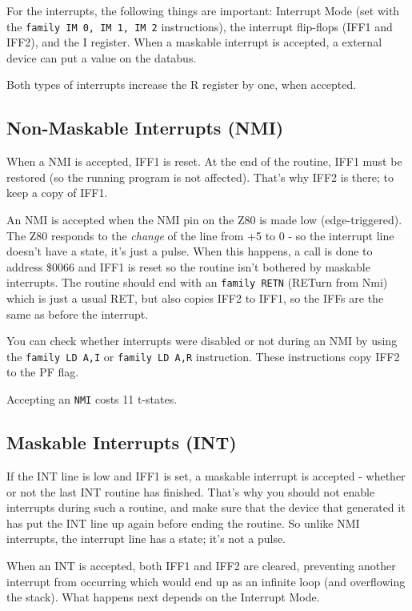 \documentclass[twoside,openright,a4paper]{book}
\begin{document}
For the interrupts, the following things are important: Interrupt Mode (set with the {\tt family IM 0, IM 1, IM 2} instructions), the interrupt flip-flops (IFF1 and IFF2), and the I register. When a maskable interrupt is accepted, a external device can put a value on the databus.

Both types of interrupts increase the R register by one, when accepted.


\subsection{Non-Maskable Interrupts (NMI)}

When a NMI is accepted, IFF1 is reset. At the end of the routine, IFF1 must be restored (so the running program is not affected). That's why IFF2 is there; to keep a copy of IFF1.

An NMI is accepted when the NMI pin on the Z80 is made low (edge-triggered). The Z80 responds to the {\em change} of the line from +5 to 0 - so the interrupt line doesn't have a state, it's just a pulse. When this happens, a call is done to address \$0066 and IFF1 is reset so the routine isn't bothered by maskable interrupts. The routine should end with an {\tt family RETN} (RETurn from Nmi) which is just a usual RET, but also copies IFF2 to IFF1, so the IFFs are the same as before the interrupt.

You can check whether interrupts were disabled or not during an NMI by using the {\tt family LD A,I} or {\tt family LD A,R} instruction. These instructions copy IFF2 to the PF flag.

Accepting an {\tt NMI} costs 11 t-states.


\subsection{Maskable Interrupts (INT)}

If the INT line is low and IFF1 is set, a maskable interrupt is accepted - whether or not the last INT routine has finished. That's why you should not enable interrupts during such a routine, and make sure that the device that generated it has put the INT line up again before ending the routine. So unlike NMI interrupts, the interrupt line has a state; it's not a pulse.

When an INT is accepted, both IFF1 and IFF2 are cleared, preventing another interrupt from occurring which would end up as an infinite loop (and overflowing the stack). What happens next depends on the Interrupt Mode.
\end{document}
